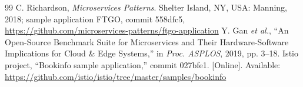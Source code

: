 \documentclass[conference]{IEEEtran}
\begin{document}
\begin{thebibliography}{99}
 C. Richardson, \textit{Microservices Patterns}. Shelter Island, NY, USA: Manning, 2018; sample application FTGO, commit 558dfc5, \url{https://github.com/microservices-patterns/ftgo-application}
 Y. Gan \textit{et al.}, ``An Open-Source Benchmark Suite for Microservices and Their Hardware-Software Implications for Cloud \& Edge Systems,'' in \textit{Proc. ASPLOS}, 2019, pp. 3--18.
 Istio project, ``Bookinfo sample application,'' commit 027bfe1. [Online]. Available: \url{https://github.com/istio/istio/tree/master/samples/bookinfo}
\end{thebibliography}
\end{document}
